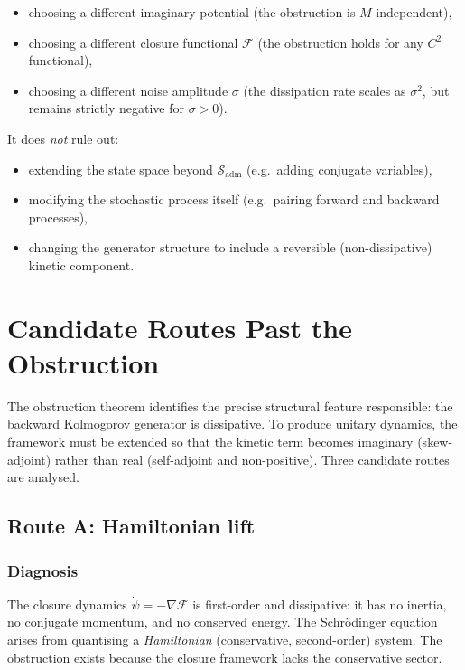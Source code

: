 \documentclass[12pt]{article}
\newcommand{\Fcal}{\mathcal{F}}
\newcommand{\Sadm}{\mathcal{S}_{\mathrm{adm}}}
\begin{document}
\begin{itemize}
    \item choosing a different imaginary potential (the obstruction is $M$-independent),
    \item choosing a different closure functional $\Fcal$ (the obstruction holds for any $C^2$ functional),
    \item choosing a different noise amplitude $\sigma$ (the dissipation rate scales as $\sigma^2$, but remains strictly negative for $\sigma > 0$).
\end{itemize}

It does \textit{not} rule out:
\begin{itemize}
    \item extending the state space beyond $\Sadm$ (e.g.\ adding conjugate variables),
    \item modifying the stochastic process itself (e.g.\ pairing forward and backward processes),
    \item changing the generator structure to include a reversible (non-dissipative) kinetic component.
\end{itemize}

\section{Candidate Routes Past the Obstruction}\label{sec:routes}

The obstruction theorem identifies the precise structural feature responsible: the backward Kolmogorov generator is dissipative. To produce unitary dynamics, the framework must be extended so that the kinetic term becomes imaginary (skew-adjoint) rather than real (self-adjoint and non-positive). Three candidate routes are analysed.

\subsection{Route A: Hamiltonian lift}\label{sec:routeA}

\subsubsection*{Diagnosis}

The closure dynamics $\dot{\psi} = -\nabla\Fcal$ is first-order and dissipative: it has no inertia, no conjugate momentum, and no conserved energy. The Schr\"odinger equation arises from quantising a \textit{Hamiltonian} (conservative, second-order) system. The obstruction exists because the closure framework lacks the conservative sector.
\end{document}

